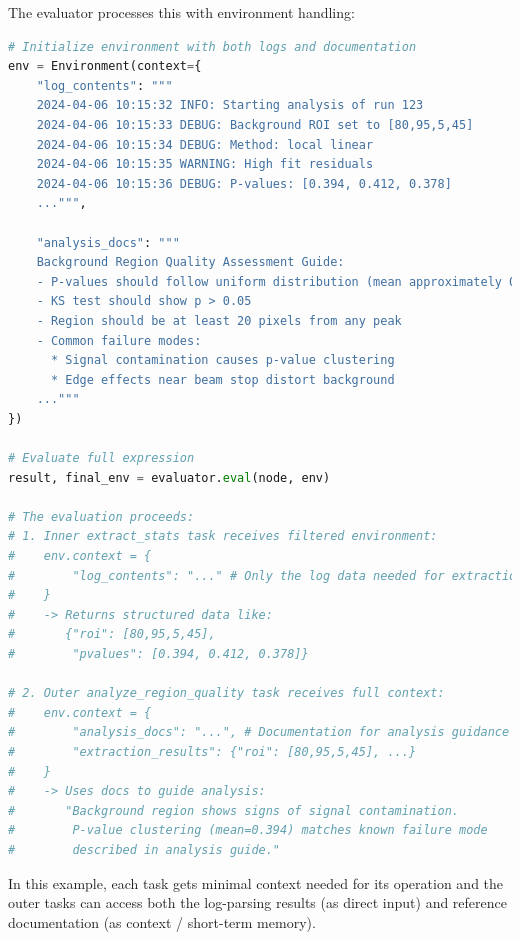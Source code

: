 \documentclass{article}
\begin{document}
The evaluator processes this with environment handling:

\begin{lstlisting}[language=Python]
# Initialize environment with both logs and documentation
env = Environment(context={
    "log_contents": """
    2024-04-06 10:15:32 INFO: Starting analysis of run 123
    2024-04-06 10:15:33 DEBUG: Background ROI set to [80,95,5,45]  
    2024-04-06 10:15:34 DEBUG: Method: local linear
    2024-04-06 10:15:35 WARNING: High fit residuals
    2024-04-06 10:15:36 DEBUG: P-values: [0.394, 0.412, 0.378]
    ...""",
    
    "analysis_docs": """
    Background Region Quality Assessment Guide:
    - P-values should follow uniform distribution (mean approximately 0.5)
    - KS test should show p > 0.05
    - Region should be at least 20 pixels from any peak
    - Common failure modes:
      * Signal contamination causes p-value clustering
      * Edge effects near beam stop distort background
    ..."""
})

# Evaluate full expression
result, final_env = evaluator.eval(node, env)

# The evaluation proceeds:
# 1. Inner extract_stats task receives filtered environment:
#    env.context = {
#        "log_contents": "..." # Only the log data needed for extraction
#    }
#    -> Returns structured data like:
#       {"roi": [80,95,5,45], 
#        "pvalues": [0.394, 0.412, 0.378]}

# 2. Outer analyze_region_quality task receives full context:
#    env.context = {
#        "analysis_docs": "...", # Documentation for analysis guidance
#        "extraction_results": {"roi": [80,95,5,45], ...}
#    }
#    -> Uses docs to guide analysis:
#       "Background region shows signs of signal contamination.
#        P-value clustering (mean=0.394) matches known failure mode
#        described in analysis guide."
\end{lstlisting}

In this example, each task gets minimal context needed for its operation and the outer tasks can access both the log-parsing results (as direct input) and reference documentation (as context / short-term memory).
\end{document}

